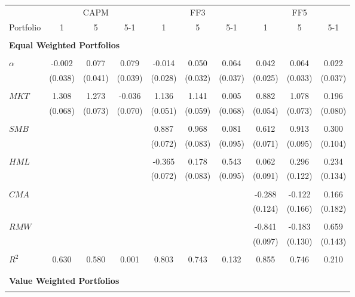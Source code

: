 \small\begin{tabular}{lccccccccc}
\toprule 
  & \multicolumn{3}{c}{CAPM} & \multicolumn{3}{c}{FF3} & \multicolumn{3}{c}{FF5} \\ 
\cline{2-10} 
 Portfolio & 1 & 5 & 5-1 & 1 & 5 & 5-1 & 1 & 5 & 5-1 \\ 
\hline \\[-1.8ex] 
\multicolumn{7}{l}{\textbf{Equal Weighted Portfolios}} \\ 
\hline \\[-1.8ex] 
$\alpha$ & -0.002  & 0.077 & 0.079 & -0.014  & 0.050 & 0.064 & 0.042  & 0.064 & 0.022 \\ 
 & (0.038) & (0.041) & (0.039) & (0.028) & (0.032) & (0.037) & (0.025) & (0.033) & (0.037) \\ \\[-1.8ex] 
$MKT$ & 1.308   & 1.273   & -0.036 & 1.136  & 1.141 & 0.005 & 0.882  & 1.078 & 0.196 \\ 
               & (0.068) & (0.073) & (0.070) & (0.051) & (0.059) & (0.068) & (0.054) & (0.073) & (0.080) \\ \\[-1.8ex] 
$SMB$ &   &  &  & 0.887  & 0.968 & 0.081 & 0.612  & 0.913 & 0.300  \\ 
 &   &   &  &  (0.072) & (0.083) & (0.095) & (0.071) & (0.095) & (0.104) \\ \\[-1.8ex] $HML$ &   &  &  & -0.365  & 0.178 & 0.543 & 0.062  & 0.296 & 0.234 \\ 
       &    &   &  &  (0.072) & (0.083) & (0.095) & (0.091) & (0.122) & (0.134) \\ \\[-1.8ex] 
$CMA$ &   &  &  & & & & -0.288  & -0.122 & 0.166  \\ 
      &   &  &  & & & & (0.124) & (0.166) & (0.182) \\ \\[-1.8ex]
 $RMW$ &   &  &  & & & & -0.841  & -0.183 & 0.659  \\ 
      &   &  &  & & & & (0.097) & (0.130) & (0.143) \\ \\[-1.8ex] 
$R^2$ & 0.630  & 0.580 & 0.001 & 0.803  & 0.743 & 0.132 & 0.855  & 0.746 & 0.210 \\ \\[-1.8ex] 
\hline \\[-1.8ex] 
\multicolumn{7}{l}{\textbf{Value Weighted Portfolios}} \\ 
\hline \\[-1.8ex] 

\end{tabular}
